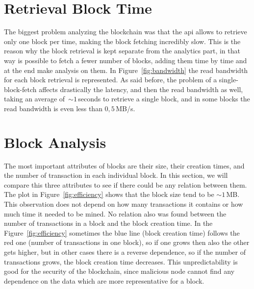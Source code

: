 \documentclass[USenglish]{uit-thesis}
\begin{document}
\section{Retrieval Block Time}
\label{sec:retrieval_block_time}
The biggest problem analyzing the blockchain was that the \gls{api} allows to
retrieve only one block per time, making the block fetching incredibly slow. This
is the reason why the block retrieval is kept separate from the analytics part,
in that way is possible to fetch a fewer number of blocks, adding them time
by time and at the end make analysis on them.
In Figure~\ref{fig:bandwidth} the read bandwidth for each block retrieval is
represented. As said before, the problem of a single-block-fetch affects
drastically the latency, and then the read bandwidth as well,
taking an average of~$\sim1$\,seconds to retrieve a
single block, and in some blocks the read bandwidth is even less than $0,5$\,MB/s.

\section{Block Analysis}
\label{sec:block_analysis}
The most important attributes of blocks are their size, their creation times, and the
number of transaction in each individual block. In this section, we will compare this
three attributes to see if there could be any relation between them.
The plot in Figure~\ref{fig:efficiency} shows that the block size tend to be $\sim1$\,MB.
This observation does not depend on how many
transactions it contains or how much time it needed to be mined.
No relation also was found between the number of transactions in a block and the block
creation time. In the Figure~\ref{fig:efficiency} sometimes the blue line (block creation time)
follows the red one (number of transactions in one block), so if one grows then also the
other gets higher, but in other cases there is a reverse dependence, so if the number of
transactions grows, the block creation time decreases. This unpredictability
is good for the security of the blockchain, since malicious node cannot find any dependence
on the data which are more representative for a block.
\end{document}

